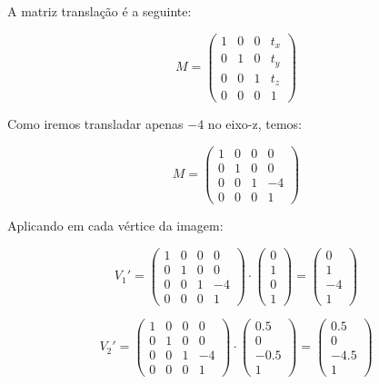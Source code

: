 \documentclass{article}
\begin{document}
A matriz translação é a seguinte:

$$M =
\begin{pmatrix}
1 & 0 & 0 & t_x\\
0 & 1 & 0 & t_y\\
0 & 0 & 1 & t_z\\
0 & 0 & 0 & 1
\end{pmatrix}$$

Como iremos transladar apenas $-4$ no eixo-z, temos:

$$M =
\begin{pmatrix}
1 & 0 & 0 & 0\\
0 & 1 & 0 & 0\\
0 & 0 & 1 & -4\\
0 & 0 & 0 & 1
\end{pmatrix}$$

Aplicando em cada vértice da imagem:

$$V_1' = \begin{pmatrix}
	1 & 0 & 0 & 0\\
	0 & 1 & 0 & 0\\
	0 & 0 & 1 & -4\\
	0 & 0 & 0 & 1
\end{pmatrix} \cdot \begin{pmatrix}
0\\
1\\
0\\
1
\end{pmatrix} = \begin{pmatrix}
0\\
1\\
-4\\
1
\end{pmatrix}$$

$$V_2' = \begin{pmatrix}
1 & 0 & 0 & 0\\
0 & 1 & 0 & 0\\
0 & 0 & 1 & -4\\
0 & 0 & 0 & 1
\end{pmatrix} \cdot \begin{pmatrix}
0.5\\
0\\
-0.5\\
1
\end{pmatrix} = \begin{pmatrix}
0.5\\
0\\
-4.5\\
1
\end{pmatrix}$$
\end{document}
